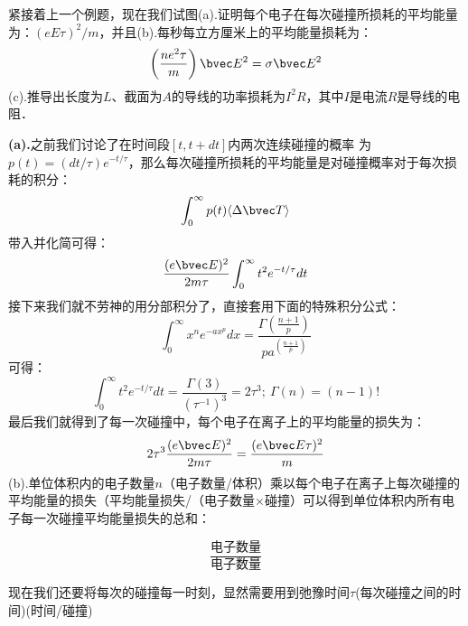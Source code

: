\begin{exercise}{}
紧接着上一个例题，现在我们试图(a).证明每个电子在每次碰撞所损耗的平均能量为：$(eE\tau)^2/m$，并且(b).每秒每立方厘米上的平均能量损耗为：
\begin{equation}
\left(\frac{ne^2\tau}{m}\right)\bvec E^2=\sigma \bvec E^2
\end{equation}
(c).推导出长度为$L$、截面为$A$的导线的功率损耗为$I^2R$，其中$I$是电流$R$是导线的电阻．

\textbf{(a).}之前我们讨论了在时间段$[t, t + dt]$内两次连续碰撞的概率
为$p(t)=(dt/\tau)e^{- t/\tau}$，那么每次碰撞所损耗的平均能量是对碰撞概率对于每次损耗的积分：
\begin{equation}
\int_0^\infty p(t) \langle\Delta\bvec T\rangle
\end{equation}
带入并化简可得：
\begin{equation}
\frac{(e\bvec E)^2}{2m\tau}\int_0^\infty t^2 e^{- t/\tau}dt
\end{equation}
接下来我们就不劳神的用分部积分了，直接套用下面的特殊积分公式：
\begin{equation}
\int_0^\infty x^n e^{-ax^p}dx = \frac{\Gamma\left(\frac{n+1}{p}\right)}{pa^{\left(\frac{n+1}{p}\right)}}
\end{equation}
可得：
\begin{equation}
\int_0^\infty t^2 e^{- t/\tau}dt=\frac{\Gamma(3)}{(\tau^{-1})^3}=2\tau^3;\ \Gamma(n)=(n-1)!
\end{equation}
最后我们就得到了每一次碰撞中，每个电子在离子上的平均能量的损失为：
\begin{equation}
2\tau^3\frac{(e\bvec E)^2}{2m\tau}=\frac{(e\bvec E\tau)^2}{m}
\end{equation}
(b).单位体积内的电子数量$n$（电子数量/体积）乘以每个电子在离子上每次碰撞的平均能量的损失（平均能量损失/（电子数量$\times$碰撞）可以得到单位体积内所有电子每一次碰撞平均能量损失的总和：

\begin{equation}
\frac{\mbox{电子数量}}{\mbox{电子数量}}
\end{equation}


现在我们还要将每次的碰撞每一时刻，显然需要用到弛豫时间$\tau$(每次碰撞之间的时间)(时间/碰撞)


\end{exercise}





